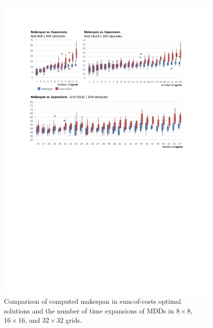 \documentclass[jair,oneside,11pt]{article}
\begin{document}
\begin{figure}[h]
\centering
\includegraphics[trim={2.5cm 14cm 2.5cm 2.5cm},clip,width=1.0\textwidth]{expr_grids-make-expand_100.pdf}
\vspace{-0.6cm}\caption{Comparison of computed makespan in sum-of-costs optimal solutions and the number of time expansions of MDDs in $8{}\times{}8$, $16{}\times{}16$, and $32{}\times{}32$ grids.}
\label{figure-make-expand-grids_100}
\end{figure}
\end{document}
